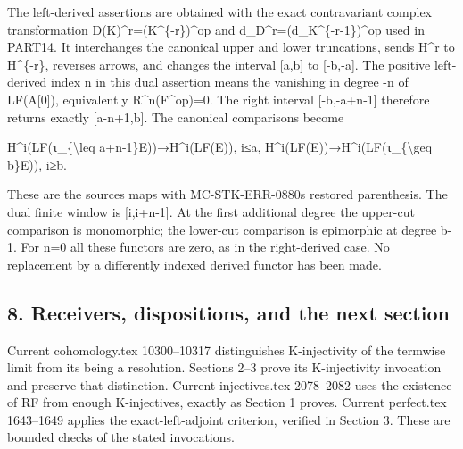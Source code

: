 The left-derived assertions are obtained with the exact contravariant complex transformation D(K)\allowbreak{}\textasciicircum{}r\allowbreak{}=(K\textasciicircum{}\{-r\})\allowbreak{}\textasciicircum{}op and d\_\allowbreak{}D\textasciicircum{}r\allowbreak{}=(d\_\allowbreak{}K\textasciicircum{}\{-r-1\})\allowbreak{}\textasciicircum{}op used in PART14. It interchanges the canonical upper and lower truncations,\allowbreak{} sends H\^{}r to H\textasciicircum{}\{-r\},\allowbreak{} reverses arrows,\allowbreak{} and changes the interval [a,\allowbreak{}b]\allowbreak{} to [-b,\allowbreak{}-a]\allowbreak{}. The positive left-derived index n in this dual assertion means the vanishing in degree -n of LF(A[0]\allowbreak{})\allowbreak{},\allowbreak{} equivalently R\textasciicircum{}n(F\textasciicircum{}op)\allowbreak{}\allowbreak{}=0. The right interval [-b,\allowbreak{}-a\allowbreak{}+n-1]\allowbreak{} therefore returns exactly [a-n\allowbreak{}+1,\allowbreak{}b]\allowbreak{}. The canonical comparisons become

H\textasciicircum{}i(LF(τ\_\allowbreak{}\{\textbackslash{}leq a\allowbreak{}+n-1\}E)\allowbreak{})\allowbreak{}\allowbreak{}→H\textasciicircum{}i(LF(E)\allowbreak{})\allowbreak{},\allowbreak{} i≤a,\allowbreak{} H\textasciicircum{}i(LF(E)\allowbreak{})\allowbreak{}\allowbreak{}→H\textasciicircum{}i(LF(τ\_\allowbreak{}\{\textbackslash{}geq b\}E)\allowbreak{})\allowbreak{},\allowbreak{} i≥b.

These are the source\textquotesingle s maps with MC-STK-ERR-0880\textquotesingle s restored parenthesis. The dual finite window is [i,\allowbreak{}i\allowbreak{}+n-1]\allowbreak{}. At the first additional degree the upper-cut comparison is monomorphic; the lower-cut comparison is epimorphic at degree b-1. For n\allowbreak{}=0 all these functors are zero,\allowbreak{} as in the right-derived case. No replacement by a differently indexed derived functor has been made.

\subsection{\texorpdfstring{8. Receivers,\allowbreak{} dispositions,\allowbreak{} and the next section}{8.   and the next section}}\label{proofs-9746-10132-receivers-dispositions-and-the-next-section}

Current cohomology.tex 10300–\allowbreak{}10317 distinguishes K-injectivity of the termwise limit from its being a resolution. Sections 2–\allowbreak{}3 prove its K-injectivity invocation and preserve that distinction. Current injectives.tex 2078–\allowbreak{}2082 uses the existence of RF from enough K-injectives,\allowbreak{} exactly as Section 1 proves. Current perfect.tex 1643–\allowbreak{}1649 applies the exact-left-adjoint criterion,\allowbreak{} verified in Section 3. These are bounded checks of the stated invocations.

